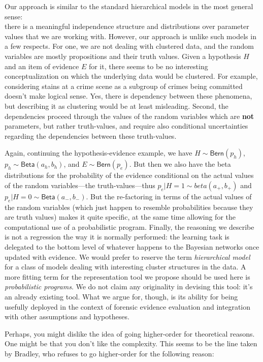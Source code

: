 \documentclass[
  letterpaper,
  DIV=11,
  numbers=noendperiod]{scrartcl}
\begin{document}
Our approach is similar to the standard hierarchical models in the most
general sense:\\
there is a meaningful independence structure and distributions over
parameter values that we are working with. However, our approach is
unlike such models in a few respects. For one, we are not dealing with
clustered data, and the random variables are mostly propositions and
their truth values. Given a hypothesis \(H\) and an item of evidence
\(E\) for it, there seems to be no interesting conceptualization on
which the underlying data would be clustered. For example, considering
stains at a crime scene as a subgroup of crimes being committed doesn't
make logical sense. Yes, there is dependency between these phenomena,
but describing it as clustering would be at least misleading. Second,
the dependencies proceed through the values of the random variables
which are \textbf{not} parameters, but rather truth-values, and require
also conditional uncertainties regarding the dependencies between these
truth-values.

Again, continuing the hypothesis-evidence example, we have
\(H \sim \mathsf{Bern}(p_h)\), \(p_h \sim \mathsf{Beta}(a_h, b_h)\), and
\(E\sim \mathsf{Bern}(p_e)\). But then we also have the beta
distributions for the probability of the evidence conditional on the
actual values of the random variables---the truth-values---thus
\(p_e \vert H = 1 \sim beta(a_{+}, b_{+} )\) and
\(p_e \vert H = 0 \sim \mathsf{Beta}(a_{-}, b_{-})\). But the
re-factoring in terms of the actual values of the random variables
(which just happen to resemble probabilities because they are truth
values) makes it quite specific, at the same time allowing for the
computational use of a probabilistic program. Finally, the reasoning we
describe is not a regression the way it is normally performed: the
learning task is delegated to the bottom level of whatever happens to
the Bayesian networks once updated with evidence. We would prefer to
reserve the term \emph{hierarchical model} for a class of models dealing
with interesting cluster structures in the data. A more fitting term for
the representation tool we propose should be used here is
\emph{probabilistic programs}. We do not claim any originality in
devising this tool: it's an already existing tool. What we argue for,
though, is its ability for being usefully deployed in the context of
forensic evidence evaluation and integration with other assumptions and
hypotheses.

Perhaps, you might dislike the idea of going higher-order for
theoretical reasons. One might be that you don't like the complexity.
This seems to be the line taken by Bradley, who refuses to go
higher-order for the following reason:
\end{document}
